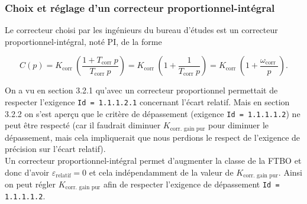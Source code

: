 \subsubsection{Choix et réglage d'un correcteur proportionnel-intégral \label{ccs_mp_2022_sec_3B3}}
Le correcteur choisi par les ingénieurs du bureau d'études est un correcteur proportionnel-intégral, noté PI, de la forme

$$
C(p)=K_{\text {corr }}\left(\frac{1+T_{\text {corr }} p}{T_{\text {corr }} p}\right)=K_{\text {corr }}\left(1+\frac{1}{T_{\text {corr }} p}\right)=K_{\text {corr }}\left(1+\frac{\omega_{\text {corr }}}{p}\right) .
$$


\ifprof
\begin{corrige}
On a vu en section 3.2.1 qu'avec un correcteur proportionnel permettait de respecter l'exigence \texttt{Id = 1.1.1.2.1} concernant l'écart relatif. Mais en section 3.2.2 on s'est aperçu que le critère de dépassement (exigence \texttt{Id = 1.1.1.1.2}) ne peut être respecté (car il faudrait diminuer $K_\text{corr. gain pur}$ pour diminuer le dépassement, mais cela impliquerait que nous perdions le respect de l'exigence de précision sur l'écart relatif).\\

Un correcteur proportionnel-intégral permet d'augmenter la classe de la FTBO et donc d'avoir $\varepsilon_\text{relatif} = 0$ et cela indépendamment de la valeur de $K_\text{corr. gain pur}$. Ainsi on peut régler $K_\text{corr. gain pur}$ afin de respecter l'exigence de dépassement \texttt{Id = 1.1.1.1.2}.
\end{corrige}
\else
\fi




